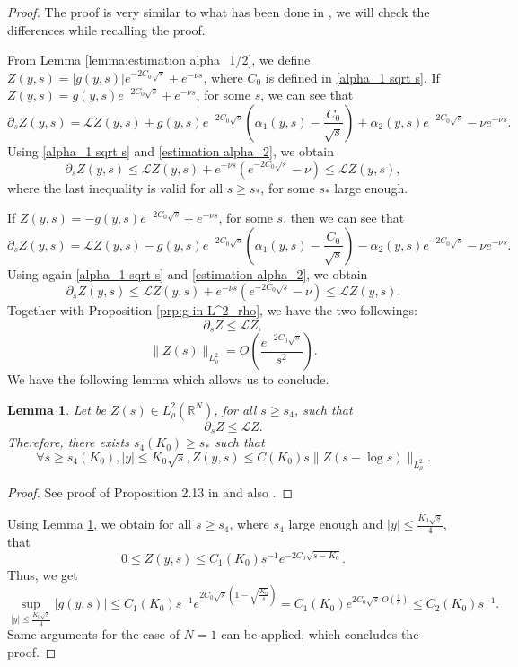 \documentclass[11pt,a4paper]{article}
\newcommand{\1}{\mathbbm{1}}
\numberwithin{equation}{section}
\newcommand{\numberset}{\mathbb}
\newcommand{\R}{\numberset{R}}
\newtheorem{lemma}{Lemma}[section]
\theoremstyle{remark}
\begin{document}
\begin{proof}
The proof is very similar to what has been done in \cite{KZ2000}, we will check the differences while recalling the proof.


From Lemma \ref{lemma:estimation alpha_1/2}, we define $Z(y,s)=|g(y,s)|e^{-2C_0\sqrt{s}}+e^{-\nu s}$, where $C_0$ is defined in \eqref{alpha_1 sqrt s}. If $Z(y,s)=g(y,s)e^{-2C_0\sqrt{s}}+e^{-\nu s}$, for some $s$, we can see that 
$$\partial_s Z(y,s)=\mathcal{L}Z(y,s)+g(y,s)e^{-2C_0 \sqrt{s}}\left(\alpha_1(y,s)-\frac{C_0}{\sqrt{s}}\right)+\alpha_2(y,s)e^{-2C_0\sqrt{s}}-\nu e^{-\nu s}.$$
Using \eqref{alpha_1 sqrt s} and \eqref{estimation alpha_2}, we obtain 
$$\partial_s Z(y,s)\leq \mathcal{L}Z(y,s)+e^{-\nu s}(e^{-2C_0\sqrt{s}}-\nu )\leq \mathcal{L}Z(y,s),$$
where the last inequality is valid for all $s\geq s_*$, for some $s_*$ large enough.

If $Z(y,s)=-g(y,s)e^{-2C_0\sqrt{s}}+e^{-\nu s}$, for some $s$, then we can see that 
$$\partial_s Z(y,s)=\mathcal{L}Z(y,s)-g(y,s)e^{-2C_0 \sqrt{s}}\left(\alpha_1(y,s)-\frac{C_0}{\sqrt{s}}\right)-\alpha_2(y,s)e^{-2C_0\sqrt{s}}-\nu e^{-\nu s}.$$
Using again \eqref{alpha_1 sqrt s} and \eqref{estimation alpha_2}, we obtain 
$$\partial_s Z(y,s)\leq \mathcal{L}Z(y,s)+e^{-\nu s}(e^{-2C_0\sqrt{s}}-\nu )\leq \mathcal{L}Z(y,s).$$
Together with Proposition \ref{prp:g in L^2_rho}, we have the two followings:
$$\partial_s Z\leq \mathcal{L}Z,$$
$$\|Z(s)\|_{L^2_\rho}=O\left(\frac{e^{-2C_0\sqrt{s}}}{s^2}\right).$$
We have the following lemma which allows us to conclude.

\begin{lemma}\label{lemma Z}
Let be $Z(s)\in L^2_\rho(\R^N)$, for all $s\geq s_4$, such that 
$$\partial_s Z\leq \mathcal{L}Z.$$
Therefore, there exists $s_4(K_0)\geq s_*$ such that
$$\forall s\geq s_4(K_0), |y|\leq K_0\sqrt{s}, Z(y,s)\leq C(K_0)s \|Z(s-\log s)\|_{L^2_\rho}.$$
\end{lemma}
\begin{proof}
See proof of Proposition 2.13 in \cite{KZ2000} and also \cite{V1992}.
\end{proof}
Using Lemma \ref{lemma Z}, we obtain for all $s\geq s_4$, where $s_4$ large enough and $|y|\leq \frac{K_0\sqrt{s}}{4}$, that
$$0\leq Z(y,s)\leq C_1(K_0)s^{-1}e^{-2C_0\sqrt{s-K_0}}.$$
Thus, we get
$$\underset{|y|\leq \frac{K_0\sqrt{s}}{4}}{\sup}|g(y,s)|\leq C_1(K_0)s^{-1}e^{2C_0\sqrt{s}(1-\sqrt{\frac{K_0}{s}})}=C_1(K_0)e^{2C_0\sqrt{s}\ O(\frac{1}{s})}\leq C_2(K_0) s^{-1}.$$
Same arguments for the case of $N=1$ can be applied, which concludes the proof.
\end{proof}
\end{document}

